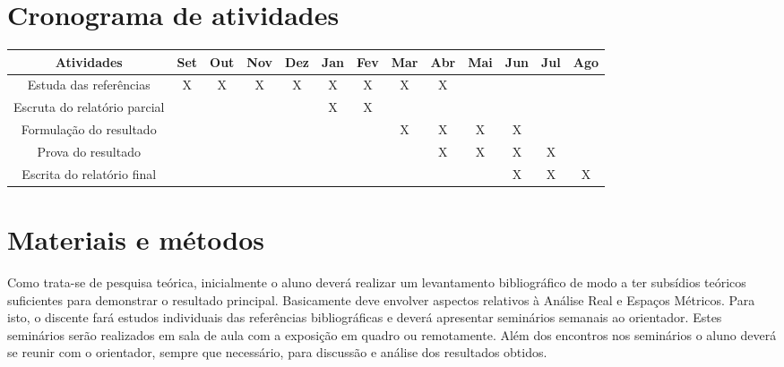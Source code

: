 \documentclass[a4paper,12pt]{article}
\begin{document}
\section{Cronograma de atividades}


\begin{adjustbox}{width={\textwidth},totalheight={\textheight},keepaspectratio}%
    \centering
    \begin{tabular}{|c|c|c|c|c|c|c|c|c|c|c|c|c|}
        \hline
        \textbf{Atividades}          & \textbf{Set} & \textbf{Out} & \textbf{Nov} & \textbf{Dez} & \textbf{Jan} & \textbf{Fev} & \textbf{Mar} & \textbf{Abr} & \textbf{Mai} & \textbf{Jun} & \textbf{Jul} & \textbf{Ago} \\
        \hline
        Estuda das referências       & X            & X            & X            & X            & X            & X            & X            & X            &              &              &              &              \\
        \hline
        Escruta do relatório parcial &              &              &              &              & X            & X            &              &              &              &              &              &              \\
        \hline
        Formulação do resultado      &              &              &              &              &              &              & X            & X            & X            & X            &              &              \\
        \hline
        Prova do resultado           &              &              &              &              &              &              &              & X            & X            & X            & X            &              \\
        \hline
        Escrita do relatório final   &              &              &              &              &              &              &              &              &              & X            & X            & X            \\
        \hline
    \end{tabular}
\end{adjustbox}


\section{Materiais e métodos}
Como trata-se de pesquisa teórica, inicialmente o aluno deverá realizar um
levantamento bibliográfico de modo a ter subsídios teóricos suficientes para
demonstrar o resultado principal. Basicamente deve envolver aspectos relativos à
Análise Real e Espaços Métricos. Para isto, o discente fará estudos individuais das
referências bibliográficas e deverá apresentar seminários semanais ao orientador.
Estes seminários serão realizados em sala de aula com a exposição em quadro ou
remotamente. Além dos encontros nos seminários o aluno deverá se reunir com o
orientador, sempre que necessário, para discussão e análise dos resultados obtidos.
\end{document}
